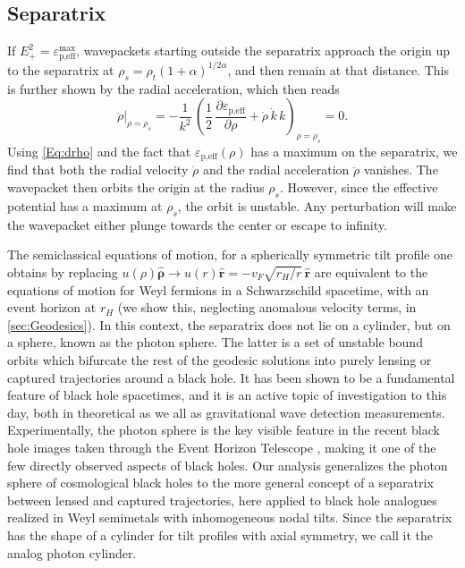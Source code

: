 \documentclass[submission, Phys]{SciPost}
\begin{document}
\subsection{Separatrix}
\label{subsec:capture}
If $E_+^2= {\varepsilon}_{\text{p,eff}}^{\text{max}}$, wavepackets starting outside the separatrix approach the origin up to the separatrix at $\rho_s=\rho_t(1+\alpha)^{1/2\alpha}$, and then remain at that distance. This is further shown by the radial acceleration, which then reads 
\begin{equation}
    \left. \ddot{\rho} \right|_{\rho=\rho_s} = -\frac{1}{k^2}\,\left(\frac{1}{2}\,\frac{\partial \varepsilon_{\text{p,eff}}}{\partial \rho} +  \dot{\rho}\, \dot{k}\, k \right)_{\rho=\rho_s} = 0.
\end{equation}
Using \cref{Eq:drho} and the fact that ${\varepsilon}_{\text{p,eff}}(\rho)$ has a maximum on the separatrix, we find that both the radial velocity $\dot{\rho}$ and the radial acceleration $\ddot{\rho}$ vanishes. The wavepacket then orbits the origin at the radius $\rho_s$. However, since the effective potential has a maximum at $\rho_s$, the orbit is unstable. Any perturbation will make the wavepacket either plunge towards the center or escape to infinity. 

The semiclassical equations of motion, for a spherically symmetric tilt profile one obtains by replacing $u(\rho)\hat{\bm \rho}\rightarrow u(r)\hat{\bm r}=-v_F\sqrt{r_H/r}\,\hat{\bm r}$ are equivalent to the equations of motion for Weyl fermions in a Schwarzschild spacetime, with an event horizon at $r_H$ (we show this, neglecting anomalous velocity terms, in \cref{sec:Geodesics}). In this context, the separatrix does not lie on a cylinder, but on a sphere, known as the photon sphere. The latter is a set of unstable bound orbits which bifurcate the rest of the geodesic solutions into purely lensing or captured trajectories around a black hole.
It has been shown to be a fundamental feature of black hole spacetimes, and it is an active topic of investigation to this day, both in theoretical \cite{Claudel_2001,Raffaelli_2022,Hadar22} as we all as gravitational wave detection measurements\cite{Cardoso16}. 
Experimentally, the photon sphere is the key visible feature in the recent black hole images taken through the Event Horizon Telescope \cite{EventHorizonTelescope:2019dse}, making it one of the few directly observed aspects of black holes.
Our analysis generalizes the photon sphere of cosmological black holes to the more general concept of a separatrix between lensed and captured trajectories, here applied to black hole analogues realized in Weyl semimetals with inhomogeneous nodal tilts.
Since the separatrix has the shape of a cylinder for tilt profiles with axial symmetry, we call it the analog photon cylinder.
\end{document}
